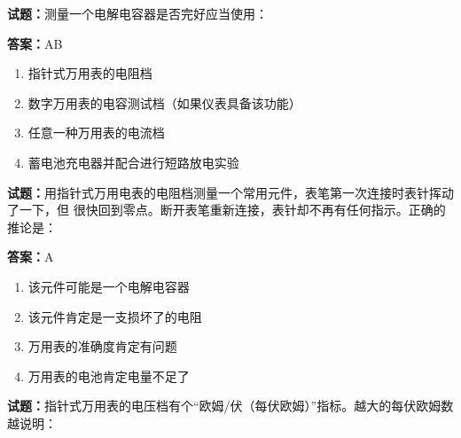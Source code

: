 \documentclass{ctexbook}
\begin{document}




\vspace{1em}

\textbf{试题：}测量一个电解电容器是否完好应当使用： 

\textbf{答案：}AB 

\begin{enumerate}[leftmargin=3em]
  \item 指针式万用表的电阻档 

  \item 数字万用表的电容测试档（如果仪表具备该功能） 

  \item 任意一种万用表的电流档 

  \item 蓄电池充电器并配合进行短路放电实验 

\end{enumerate}





\vspace{1em}

\textbf{试题：}用指针式万用电表的电阻档测量一个常用元件，表笔第一次连接时表针挥动了一下，但
很快回到零点。断开表笔重新连接，表针却不再有任何指示。正确的推论是： 

\textbf{答案：}A 

\begin{enumerate}[leftmargin=3em]
  \item 该元件可能是一个电解电容器 

  \item 该元件肯定是一支损坏了的电阻 

  \item 万用表的准确度肯定有问题 

  \item 万用表的电池肯定电量不足了 

\end{enumerate}






\vspace{1em}

\textbf{试题：}指针式万用表的电压档有个“欧姆/伏（每伏欧姆）”指标。越大的每伏欧姆数越说明： 
\end{document}
